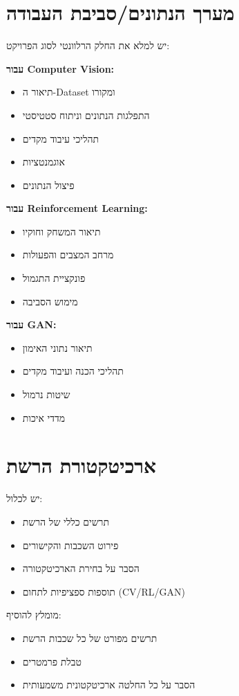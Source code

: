\documentclass[11pt]{article}
\begin{document}
\section{מערך הנתונים/סביבת העבודה}
\begin{fillbox}
יש למלא את החלק הרלוונטי לסוג הפרויקט:

\textbf{עבור Computer Vision:}
\begin{itemize}
  \item תיאור ה-Dataset ומקורו
  \item התפלגות הנתונים וניתוח סטטיסטי
  \item תהליכי עיבוד מקדים
  \item אוגמנטציות
  \item פיצול הנתונים
\end{itemize}

\textbf{עבור Reinforcement Learning:}
\begin{itemize}
  \item תיאור המשחק וחוקיו
  \item מרחב המצבים והפעולות
  \item פונקציית התגמול
  \item מימוש הסביבה
\end{itemize}

\textbf{עבור GAN:}
\begin{itemize}
  \item תיאור נתוני האימון
  \item תהליכי הכנה ועיבוד מקדים
  \item שיטות נרמול
  \item מדדי איכות
\end{itemize}
\end{fillbox}

\section{ארכיטקטורת הרשת}
\begin{fillbox}
יש לכלול:
\begin{itemize}
  \item תרשים כללי של הרשת
  \item פירוט השכבות והקישורים
  \item הסבר על בחירת הארכיטקטורה
  \item תוספות ספציפיות לתחום (CV/RL/GAN)
\end{itemize}

מומלץ להוסיף:
\begin{itemize}
  \item תרשים מפורט של כל שכבות הרשת
  \item טבלת פרמטרים
  \item הסבר על כל החלטה ארכיטקטונית משמעותית
\end{itemize}
\end{fillbox}
\end{document}
